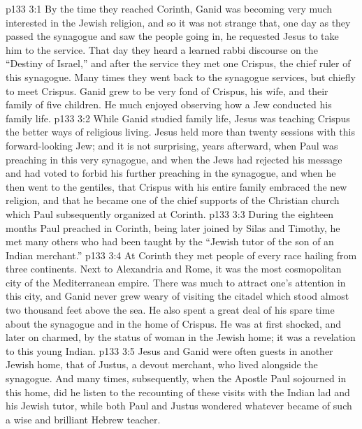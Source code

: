 \vs p133 3:1 By the time they reached Corinth, Ganid was becoming very much interested in the Jewish religion, and so it was not strange that, one day as they passed the synagogue and saw the people going in, he requested Jesus to take him to the service. That day they heard a learned rabbi discourse on the “Destiny of Israel,” and after the service they met one Crispus, the chief ruler of this synagogue. Many times they went back to the synagogue services, but chiefly to meet Crispus. Ganid grew to be very fond of Crispus, his wife, and their family of five children. He much enjoyed observing how a Jew conducted his family life.
\vs p133 3:2 While Ganid studied family life, Jesus was teaching Crispus the better ways of religious living. Jesus held more than twenty sessions with this forward\hyp{}looking Jew; and it is not surprising, years afterward, when Paul was preaching in this very synagogue, and when the Jews had rejected his message and had voted to forbid his further preaching in the synagogue, and when he then went to the gentiles, that Crispus with his entire family embraced the new religion, and that he became one of the chief supports of the Christian church which Paul subsequently organized at Corinth.
\vs p133 3:3 During the eighteen months Paul preached in Corinth, being later joined by Silas and Timothy, he met many others who had been taught by the “Jewish tutor of the son of an Indian merchant.”
\vs p133 3:4 At Corinth they met people of every race hailing from three continents. Next to Alexandria and Rome, it was the most cosmopolitan city of the Mediterranean empire. There was much to attract one’s attention in this city, and Ganid never grew weary of visiting the citadel which stood almost two thousand feet above the sea. He also spent a great deal of his spare time about the synagogue and in the home of Crispus. He was at first shocked, and later on charmed, by the status of woman in the Jewish home; it was a revelation to this young Indian.
\vs p133 3:5 Jesus and Ganid were often guests in another Jewish home, that of Justus, a devout merchant, who lived alongside the synagogue. And many times, subsequently, when the Apostle Paul sojourned in this home, did he listen to the recounting of these visits with the Indian lad and his Jewish tutor, while both Paul and Justus wondered whatever became of such a wise and brilliant Hebrew teacher.
